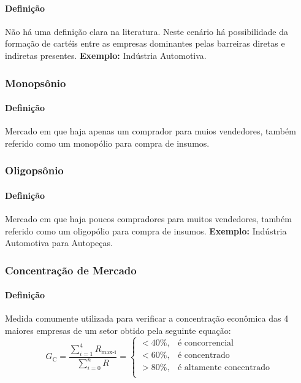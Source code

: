 \documentclass{article}
\begin{document}
            \paragraph{Definição}Não há uma definição clara na literatura. Neste cenário há possibilidade da formação de cartéis entre as empresas dominantes pelas barreiras diretas e indiretas presentes. \textbf{Exemplo:} Indústria Automotiva.

        \subsubsection{Monopsônio}
            \paragraph{Definição}Mercado em que haja apenas um comprador para muios vendedores, também referido como um monopólio para compra de insumos.

        \subsubsection{Oligopsônio}
            \paragraph{Definição}Mercado em que haja poucos compradores para muitos vendedores, também referido como um oligopólio para compra de insumos. \textbf{Exemplo:} Indústria Automotiva para Autopeças.

        \subsubsection{Concentração de Mercado}
            \paragraph{Definição}Medida comumente utilizada para verificar a concentração econômica das 4 maiores empresas de um setor obtido pela seguinte equação:
                \begin{equation}
                    \boxed{
                        G_{\text{C}} = 
                        \frac{\sum\limits_{i=1}^{4} R_{\text{max-i}}}{\sum\limits_{i=0} ^{n} R}
                    } =
                    \begin{cases}
                        <40\%, & \text{é concorrencial}\\
                        <60\%, & \text{é concentrado}\\
                        >80\%, & \text{é altamente concentrado}\\
                    \end{cases}
                \end{equation}
\end{document}
